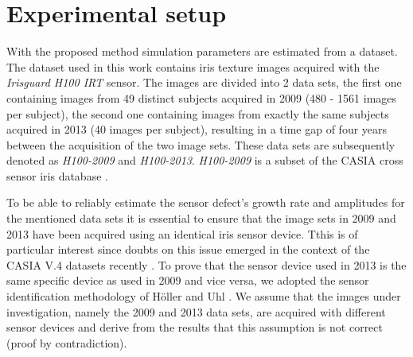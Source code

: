 \documentclass[10pt,twocolumn,letterpaper]{article}
\begin{document}

\section{Experimental setup}
 \label{testing}
 With the proposed method simulation parameters are estimated from a dataset. The dataset used in this work contains iris texture images acquired with the \emph{Irisguard H100 IRT} sensor. The images are divided into 2 data sets, the first one containing images from 49 distinct subjects acquired in 2009 (480 - 1561 images per subject), the second one containing images from exactly the same subjects acquired in 2013 (40 images per subject), resulting in a time gap of four years between the acquisition of the two image sets. These data sets are subsequently denoted as \emph{H100-2009} and \emph{H100-2013}. \emph{H100-2009} is a subset of the CASIA cross sensor iris database \cite{Xiao13a}.

To be able to reliably estimate the sensor defect's growth rate and amplitudes for the mentioned data sets it is essential to ensure that the image sets in 2009 and 2013 have been acquired using an identical iris sensor device. Tthis is of particular interest since doubts on this issue emerged in the context of the CASIA V.4 datasets recently \cite{Debiasi14a}. 
To prove that the sensor device used in 2013 is the same specific device as used in 2009 and vice versa, we adopted the sensor identification methodology of H\"oller and Uhl \cite{UhlH12}. 
We assume that the images under investigation, namely the 2009 and 2013 data sets, are acquired with different sensor devices and derive from the results that this assumption is not correct (proof by contradiction).
\end{document}
